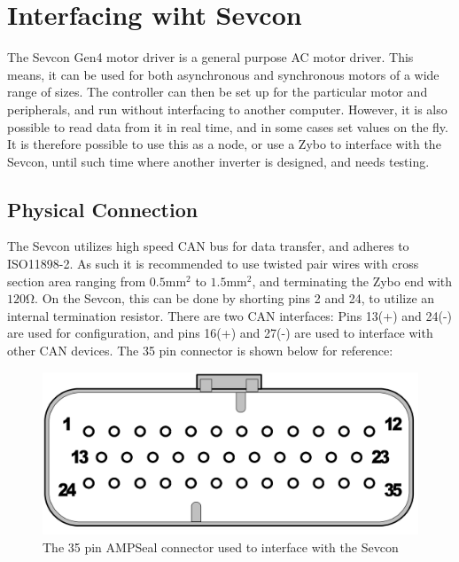 

\section{Interfacing wiht Sevcon}\label{sec:interfacin_with_sevcon}
The Sevcon Gen4 motor driver is a general purpose AC motor driver. 
This means, it can be used for both asynchronous and synchronous motors of a wide range of sizes.
The controller can then be set up for the particular motor and peripherals, and run without interfacing to another computer.
However, it is also possible to read data from it in real time, and in some cases set values on the fly.
It is therefore possible to use this as a node, or use a Zybo to interface with the Sevcon, until such time where another inverter is designed, and needs testing. \\

\subsection{Physical Connection}\label{sub:sevcon_physical_connection}
The Sevcon utilizes high speed CAN bus for data transfer, and adheres to ISO11898-2.
As such it is recommended to use twisted pair wires with cross section area ranging from $0.5 \si{\milli \meter \squared}$ to $1.5 \si{\milli \meter \squared}$, and terminating the Zybo end with $120 \si{\ohm}$.
On the Sevcon, this can be done by shorting pins 2 and 24, to utilize an internal termination resistor.
There are two CAN interfaces: Pins 13(+) and 24(-) are used for configuration, and pins 16(+) and 27(-) are used to interface with other CAN devices.
The 35 pin connector is shown below for reference:

\begin{figure}[h]
	\centering
	\includegraphics[width = 0.6\linewidth]{graphics/35_pin_dsub}
	\caption{The 35 pin AMPSeal connector used to interface with the Sevcon}
	\label{fig:35_pin_dsub}
\end{figure}

